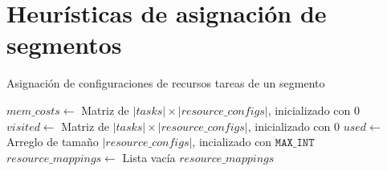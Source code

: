 \chapter[Experimentos]{Heurísticas de asignación de segmentos}

\begin{algorithm}
\caption{Asignación de configuraciones de recursos tareas de un segmento}
\label{alg_blind_segment_schedule}
\begin{algorithmic}[1]

	\State $mem\_costs \gets$ Matriz de $|tasks| \times |resource\_configs|$, inicializado con 0 
	\State $visited \gets$ Matriz de $|tasks| \times |resource\_configs|$, inicializado con 0
	\State $used \gets$ Arreglo de tamaño $|resource\_configs|$, incializado con $\texttt{MAX\_INT}$
	\State $resource\_mappings \gets$ Lista vacía
	\State {}
	\State {}
	\State \Return $resource\_mappings$
\EndProcedure
\end{algorithmic}
\end{algorithm}


